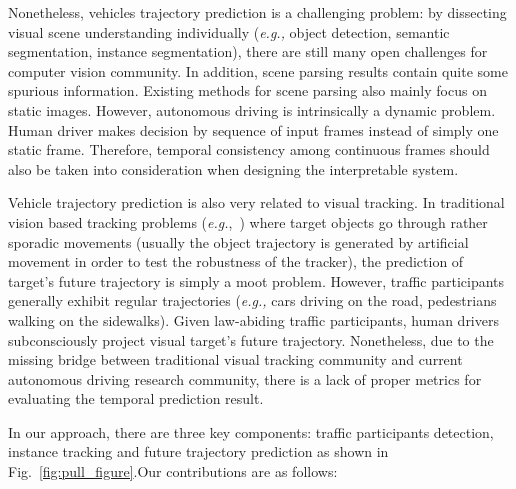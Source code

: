 \documentclass[10pt,twocolumn,letterpaper]{article}
\begin{document}

Nonetheless, vehicles trajectory prediction is a challenging problem: by dissecting visual scene understanding individually (\emph{e.g.,} object detection, semantic segmentation, instance segmentation),  there are still many open challenges for computer vision community.
In addition, scene parsing results contain quite some spurious information.
Existing methods for scene parsing also mainly focus on static images.
However, autonomous driving is intrinsically a dynamic problem. Human driver makes decision by sequence of input frames instead of simply one static frame.
Therefore, temporal consistency among continuous frames should also be taken into consideration when designing the interpretable system.




Vehicle trajectory prediction is also very related to visual tracking.
In traditional vision based tracking problems (\emph{e.g.},~\cite{wu2013online, wu2015object, mueller2016benchmark}) where target objects go through rather sporadic movements (usually the object trajectory is generated by artificial movement in order to test the robustness of the tracker), the prediction of target's future trajectory is simply a moot problem.
However, traffic participants generally exhibit regular trajectories (\emph{e.g.,} cars driving on the road, pedestrians walking on the sidewalks). Given law-abiding traffic participants, human drivers subconsciously project visual target's future trajectory.
Nonetheless, due to the missing bridge between traditional visual tracking community and current autonomous driving research community, there is a lack of proper metrics for evaluating the temporal prediction result.



In our approach, there are three key components: traffic participants detection, instance tracking and future trajectory prediction as shown in Fig.~\ref{fig:pull_figure}.Our contributions are as follows:
\end{document}
